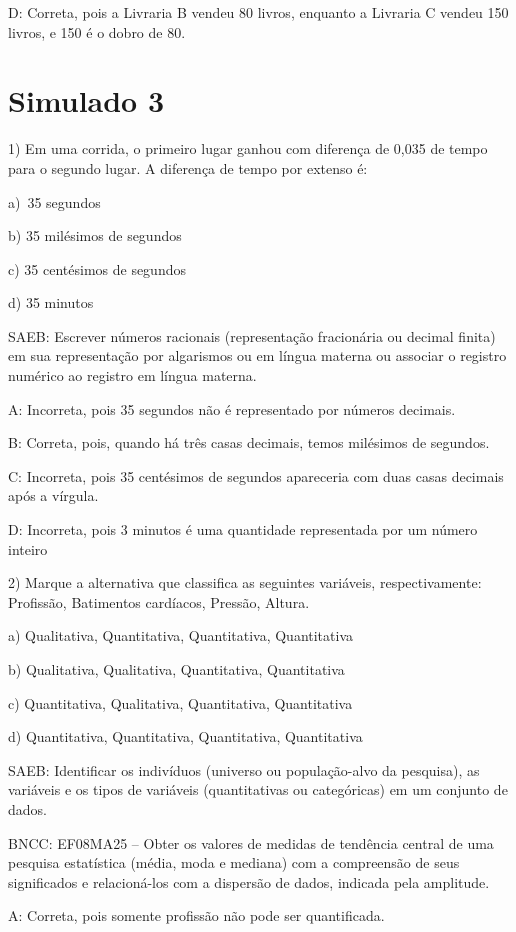 D: Correta, pois a Livraria B vendeu 80 livros, enquanto a Livraria C
vendeu 150 livros, e 150 é o dobro de 80.


\section{Simulado 3}

1) Em uma corrida, o primeiro lugar ganhou com diferença de 0,035 de
tempo para o segundo lugar. A diferença de tempo por extenso é:

a)~35 segundos

b) 35 milésimos de segundos

c) 35 centésimos de segundos~

d) 35 minutos

SAEB: Escrever números racionais (representação fracionária ou decimal
finita) em sua representação por algarismos ou em língua materna ou
associar o registro numérico ao registro em língua materna.

A: Incorreta, pois 35 segundos não é representado por números decimais.

B: Correta, pois, quando há três casas decimais, temos milésimos de
segundos.

C: Incorreta, pois 35 centésimos de segundos apareceria com duas casas
decimais após a vírgula.

D: Incorreta, pois 3 minutos é uma quantidade representada por um número
inteiro

2) Marque a alternativa que classifica as seguintes variáveis,
respectivamente: Profissão, Batimentos cardíacos, Pressão, Altura.

a) Qualitativa, Quantitativa, Quantitativa, Quantitativa

b) Qualitativa, Qualitativa, Quantitativa, Quantitativa

c) Quantitativa, Qualitativa, Quantitativa, Quantitativa

d) Quantitativa, Quantitativa, Quantitativa, Quantitativa

SAEB: Identificar os indivíduos (universo ou população-alvo da
pesquisa), as variáveis e os tipos de variáveis (quantitativas ou
categóricas) em um conjunto de dados.

BNCC: EF08MA25 -- Obter os valores de medidas de tendência central de
uma pesquisa estatística (média, moda e mediana) com a compreensão de
seus significados e relacioná-los com a dispersão de dados, indicada
pela amplitude.

A: Correta, pois somente profissão não pode ser quantificada.

